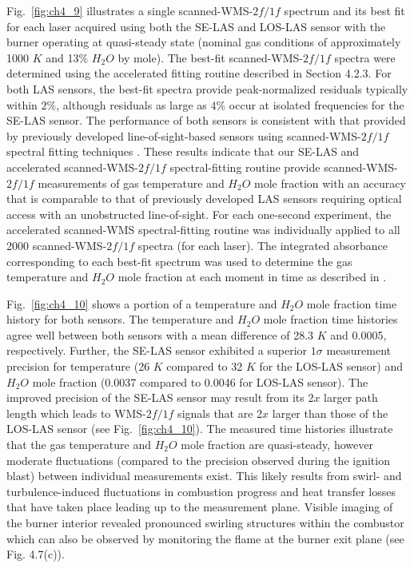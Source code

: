 Fig.\ \ref{fig:ch4_9} illustrates a single scanned-WMS-$2f/1f$ spectrum and its best fit for each laser acquired using both the SE-LAS and LOS-LAS sensor with the burner operating at quasi-steady state (nominal gas conditions of approximately 1000 $K$ and 13$\%$ $H_2O$ by mole). The best-fit scanned-WMS-$2f/1f$ spectra were determined using the accelerated fitting routine described in Section 4.2.3. For both LAS sensors, the best-fit spectra provide peak-normalized residuals typically within $2\%$, although residuals as large as $4\%$ occur at isolated frequencies for the SE-LAS sensor. The performance of both sensors is consistent with that provided by previously developed line-of-sight-based sensors using scanned-WMS-$2f/1f$ spectral fitting techniques \cite{Makowiecki2017,Goldenstein2014,goldenstein2014scanned,spearrin2014simultaneous}. These results indicate that our SE-LAS and accelerated scanned-WMS-$2f/1f$ spectral-fitting routine provide scanned-WMS-$2f/1f$ measurements of gas temperature and $H_2O$ mole fraction with an accuracy that is comparable to that of previously developed LAS sensors requiring optical access with an unobstructed line-of-sight. For each one-second experiment, the accelerated scanned-WMS spectral-fitting routine was individually applied to all 2000 scanned-WMS-$2f/1f$ spectra (for each laser). The integrated absorbance corresponding to each best-fit spectrum was used to determine the gas temperature and $H_2O$ mole fraction at each moment in time as described in \cite{Goldenstein2014}.

Fig.\ \ref{fig:ch4_10} shows a portion of a temperature and $H_2O$ mole fraction time history for both sensors. The temperature and $H_2O$ mole fraction time histories agree well between both sensors with a mean difference of 28.3 $K$ and 0.0005, respectively. Further, the SE-LAS sensor exhibited a superior $1\sigma$ measurement precision for temperature (26 $K$ compared to 32 $K$ for the LOS-LAS sensor) and $H_2O$ mole fraction (0.0037 compared to 0.0046 for LOS-LAS sensor). The improved precision of the SE-LAS sensor may result from its 2$x$ larger path length which leads to WMS-$2f/1f$ signals that are 2$x$ larger than those of the LOS-LAS sensor (see Fig.\ \ref{fig:ch4_10}). The measured time histories illustrate that the gas temperature and $H_2O$ mole fraction are quasi-steady, however moderate fluctuations (compared to the precision observed during the ignition blast) between individual measurements exist. This likely results from swirl- and turbulence-induced fluctuations in combustion progress and heat transfer losses that have taken place leading up to the measurement plane. Visible imaging of the burner interior revealed pronounced swirling structures within the combustor which can also be observed by monitoring the flame at the burner exit plane (see Fig. 4.7(c)).

